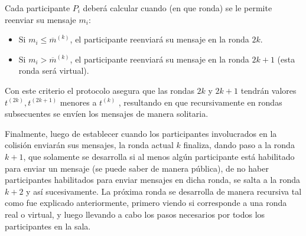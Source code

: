 Cada participante $P_i$ deberá calcular cuando (en que ronda) se le permite reenviar su mensaje $m_i$:
\begin{itemize}
    \item Si $m_i \leq \overline{m}^{(k)}$, el participante reenviará su mensaje en la ronda $2k$.
    \item Si $m_i > \overline{m}^{(k)}$, el participante reenviará su mensaje en la ronda $2k + 1$ (esta ronda será virtual).
\end{itemize}

Con este criterio el protocolo asegura que las rondas $2k$ y $2k + 1$ tendrán valores $t^{(2k)}, t^{(2k + 1)}$ menores a $t^{(k)}$  , resultando en que recursivamente en rondas subsecuentes se envíen los mensajes de manera solitaria.

Finalmente, luego de establecer cuando los participantes involucrados en la colisión enviarán sus mensajes, la ronda actual $k$ finaliza, dando paso a la ronda $k+1$, que solamente se desarrolla si al menos algún participante está habilitado para enviar un mensaje (se puede saber de manera pública), de no haber participantes habilitados para enviar mensajes en dicha ronda, se salta a la ronda $k+2$ y así sucesivamente. La próxima ronda se desarrolla de manera recursiva tal como fue explicado anteriormente, primero viendo si corresponde a una ronda real o virtual, y luego llevando a cabo los pasos necesarios por todos los participantes en la sala.


